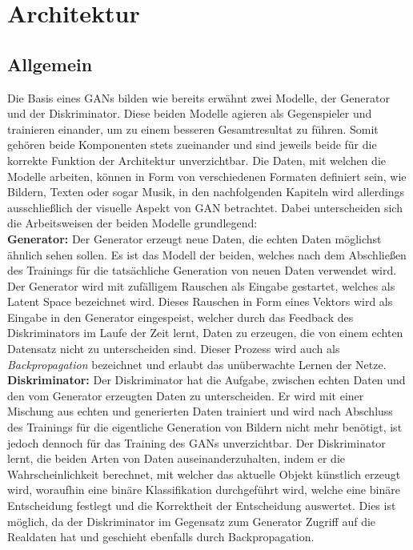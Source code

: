 \section{Architektur}

\subsection{Allgemein}

\noindent Die Basis eines \acp{GAN} bilden wie bereits erwähnt zwei Modelle, der Generator und der Diskriminator. Diese beiden Modelle agieren als Gegenspieler und trainieren einander, um zu einem besseren Gesamtresultat zu führen. Somit gehören beide Komponenten stets zueinander und sind jeweils beide für die korrekte Funktion der Architektur unverzichtbar. Die Daten, mit welchen die Modelle arbeiten, können in Form von verschiedenen Formaten definiert sein, wie Bildern, Texten oder sogar Musik, in den nachfolgenden Kapiteln wird allerdings ausschließlich der visuelle Aspekt von \acs{GAN} betrachtet. Dabei unterscheiden sich die Arbeitsweisen der beiden Modelle grundlegend: \\

\noindent \textbf{Generator:} Der Generator erzeugt neue Daten, die echten Daten möglichst ähnlich sehen sollen. Es ist das Modell der beiden, welches nach dem Abschließen des Trainings für die tatsächliche Generation von neuen Daten verwendet wird. Der Generator wird mit zufälligem Rauschen als Eingabe gestartet, welches als Latent Space bezeichnet wird. Dieses Rauschen in Form eines Vektors wird als Eingabe in den Generator eingespeist, welcher durch das Feedback des Diskriminators im Laufe der Zeit lernt, Daten zu erzeugen, die von einem echten Datensatz nicht zu unterscheiden sind. Dieser Prozess wird auch als \textit{Backpropagation} bezeichnet und erlaubt das unüberwachte Lernen der Netze. \\

\noindent \textbf{Diskriminator:} Der Diskriminator hat die Aufgabe, zwischen echten Daten und den vom Generator erzeugten Daten zu unterscheiden. Er wird mit einer Mischung aus echten und generierten Daten trainiert und wird nach Abschluss des Trainings für die eigentliche Generation von Bildern nicht mehr benötigt, ist jedoch dennoch für das Training des \acp{GAN} unverzichtbar. Der Diskriminator lernt, die beiden Arten von Daten auseinanderzuhalten, indem er die Wahrscheinlichkeit berechnet, mit welcher das aktuelle Objekt künstlich erzeugt wird, woraufhin eine binäre Klassifikation durchgeführt wird, welche eine binäre Entscheidung festlegt und die Korrektheit der Entscheidung auswertet. Dies ist möglich, da der Diskriminator im Gegensatz zum Generator Zugriff auf die Realdaten hat und geschieht ebenfalls durch Backpropagation. \\

